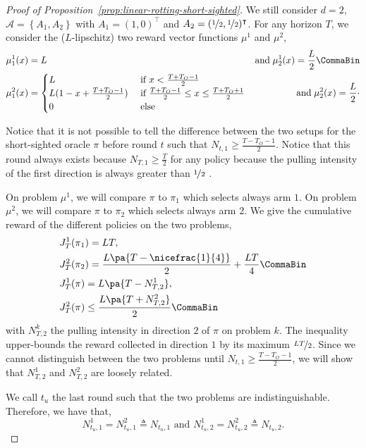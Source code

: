\begin{proof}[Proof of Proposition~\ref{prop:linear-rotting-short-sighted}]
We still consider $d = 2$, $\mathcal{A} = \left\{ A_1, A_2 \right\}$ with $A_1 = (1,0)^\intercal$ and $A_2 = (\nicefrac{1}{2},\nicefrac{1}{2})^\intercal$. For any horizon $T$, we consider the ($L$-lipschitz) two reward vector functions $\mu^1$ and $\mu^2$,
\begin{align*}
&\mu^1_1(x) = L  & \text{and} \;  \mu^1_2(x) = \frac{L}{2} \CommaBin\\
&\mu^2_1(x) = \begin{cases}
L &\text{ if } x <\frac{T+T_O-1}{2} \\
L(1- x +  \frac{T +T_O -1}{2}) &\text{ if }  \frac{T +T_O-1}{2} \leq x \leq \frac{T +T_O+1}{2}\\
0 &\text{ else}
\end{cases}
 & \text{and} \; \mu^2_2(x) = \frac{L}{2}\cdot
\end{align*}

Notice that it is not possible to tell the difference between the two setups for the short-sighted oracle $\pi$ before round $t$ such that $ N_{t,1} \geq \frac{T -T_O -1}{2}$. Notice that this round always exists because $N_{T,1} \geq \frac{T}{2}$ for any policy because the pulling intensity of the first direction is always greater than $\nicefrac{1}{2}$ .

On problem $\mu^1$, we will compare $\pi$ to $\pi_1$ which selects always arm $1$. On problem $\mu^2$, we will compare $\pi$ to $\pi_2$ which selects always arm $2$. We give the cumulative reward of the different policies on the two problems,
\begin{align}
&J^1_T(\pi_1) = LT, \label{eq:linear-J1Tpi1}\\ 
&J^2_T(\pi_2) = \frac{L\pa{T -\nicefrac{1}{4}}}{2} + \frac{LT}{4}\CommaBin\label{eq:linear-J2Tpi2}\\
&J^1_T(\pi) = L\pa{T - N^1_{T,2}}, \label{eq:linear-J1Tpi} \\
&J^2_T(\pi) \leq \frac{L\pa{T + N^2_{T,2}}}{2}\CommaBin\label{eq:linear-J2Tpi}
\end{align}
with $N^k_{T,2}$ the pulling intensity in direction $2$ of $\pi$ on problem $k$. The inequality upper-bounds the reward collected in direction $1$ by its maximum $\nicefrac{LT}{2}$. Since we cannot distinguish between the two problems until $N_{t,1} \geq \frac{T - T_O -1}{2} $, we will show that $N^1_{T,2}$ and $N^2_{T,2}$ are loosely related. 

We call $t_u$ the last round such that the two problems are indistinguishable. Therefore, we have that, 
\[
N_{t_u,1}^1 = N_{t_u,1}^2 \triangleq  N_{t_u,1} \text{ and } N_{t_u,2}^1 = N_{t_u,2}^2\triangleq  N_{t_u,2} .
\]


\end{proof}
